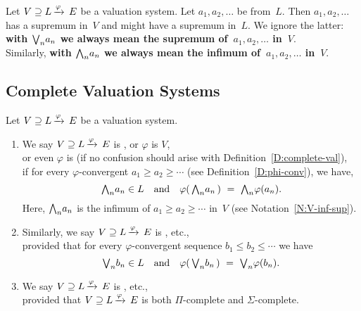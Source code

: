 %
%
\begin{nt}
\label{N:V-inf-sup}
Let $V \supseteq L\,\smash{\xrightarrow{\varphi}\,E}$ be a  valuation system.
Let $a_1, a_2, \dotsc$ be from~$L$.
Then $a_1, a_2,\dotsc$ has a supremum
in~$V$ and might have a supremum in~$L$.
We ignore the latter:
\textbf{with $\textstyle{\bigvee}_n a_n$
we always mean the supremum of~$a_1, a_2,\dotsc $ in~$V$}.\\
Similarly, \textbf{with $\textstyle{\bigwedge}_n a_n$
we always mean the infimum of~$a_1, a_2,\dotsc $ in~$V$}.
\end{nt}
%
%
%
\subsection{Complete Valuation Systems}
\label{SS:complete-valuation-systems}
%
%
\begin{dfn}
\label{D:system-complete}
Let $V \supseteq L\,\smash{\xrightarrow{\varphi}\,E}$ be a valuation system.
\begin{enumerate}
\item 
We say $V \supseteq L\,\smash{\xrightarrow{\varphi}\,E}$
is ,
or  $\varphi$ is  $V$,\\
or even $\varphi$ is   (if no confusion should 
arise with
Definition~\ref{D:complete-val}),\\
if for every $\varphi$-convergent
$a_1\geq a_2 \geq \dotsb$ 
(see Definition~\ref{D:phi-conv}), we have,
\begin{equation*}
   \textstyle{\bigwedge}_n a_n \in L\quad 
  \text{and}\quad
  \varphi(\,\textstyle{\bigwedge}_n a_n\,) \ =\  \textstyle{\bigwedge}_n \varphi(a_n).
\end{equation*}
Here, $\textstyle{\bigwedge}_n a_n$
is the infimum of $a_1 \geq a_2 \geq \dotsb$ in~$V$
(see Notation~\ref{N:V-inf-sup}).

\item
Similarly,
we say $V \supseteq L\,\smash{\xrightarrow{\varphi}\,E}$
is , etc.,\\
provided that for every $\varphi$-convergent sequence
$b_1\leq b_2 \leq \dotsb$ we have
\begin{equation*}
   \textstyle{\bigvee}_n b_n \in L\quad 
  \text{and}\quad
  \varphi(\,\textstyle{\bigvee}_n b_n\,) \ =\  \textstyle{\bigvee}_n \varphi(b_n).
\end{equation*}

\item
We say $V \supseteq L\,\smash{\xrightarrow{\varphi}\,E}$
is , etc.,\\
provided that 
$V \supseteq L\,\smash{\xrightarrow{\varphi}\,E}$
is both $\Pi$-complete and $\Sigma$-complete.
\end{enumerate}
\end{dfn}

